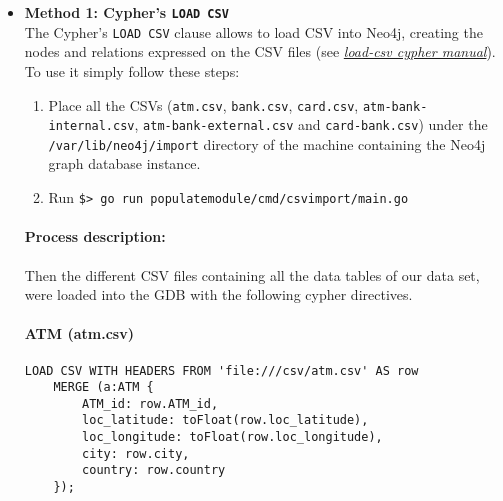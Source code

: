 \begin{itemize}
\item{\textbf{Method 1: Cypher's \texttt{LOAD CSV}}\\}
The Cypher's \texttt{LOAD CSV} clause allows to load CSV into Neo4j, creating the nodes and relations expressed on the CSV files (see \href{https://neo4j.com/docs/cypher-manual/5/clauses/load-csv/}{\textit{load-csv cypher manual}}). 
To use it simply follow these steps:
\begin{enumerate}
    \item Place all the CSVs (\texttt{atm.csv}, \texttt{bank.csv}, \texttt{card.csv}, \texttt{atm-bank-internal.csv}, \texttt{atm-bank-external.csv} 
    and \texttt{card-bank.csv}) under the \texttt{/var/lib/neo4j/import} directory
    of the machine containing the Neo4j graph database instance.
    \item Run \texttt{\$> go run populatemodule/cmd/csvimport/main.go}
\end{enumerate}

\paragraph{Process description:}

Then the different CSV files containing all the data tables of our data set, were loaded into the GDB with the following cypher directives.


\paragraph{ATM (atm.csv)}

\begin{center}
\lstset{style=cypherStyle}
\begin{lstlisting}[caption={atm.csv}]
    LOAD CSV WITH HEADERS FROM 'file:///csv/atm.csv' AS row
    MERGE (a:ATM {
        ATM_id: row.ATM_id,
        loc_latitude: toFloat(row.loc_latitude),
        loc_longitude: toFloat(row.loc_longitude),
        city: row.city,
        country: row.country
    });
\end{lstlisting}
\end{center}


\end{itemize}
